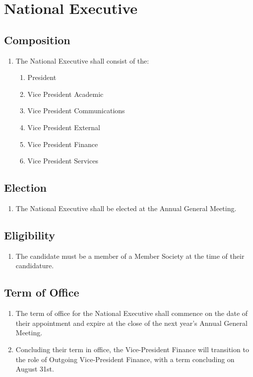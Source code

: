 \section{National Executive}
\label{national-executive}

\subsection{Composition}
\label{national-executive-composition}

\begin{enumerate}
 \item The National Executive shall consist of the:
  \begin{enumerate}
   \item President
   \item Vice President Academic
   \item Vice President Communications
   \item Vice President External
   \item Vice President Finance
   \item Vice President Services
  \end{enumerate}
\end{enumerate}

\subsection{Election}
\label{national-executive-election}

\begin{enumerate}
 \item The National Executive shall be elected at the Annual General Meeting.
\end{enumerate}

\subsection{Eligibility}
\label{national-executive-eligibility}

\begin{enumerate}
 \item The candidate must be a member of a Member Society at the time of their candidature.
\end{enumerate}

\subsection{Term of Office}
\label{national-executive-term-of-office}

\begin{enumerate}
 \item The term of office for the National Executive shall commence on the date of their appointment and expire at the close of the next year’s Annual General Meeting.
 \item Concluding their term in office, the Vice-President Finance will transition to the role of Outgoing Vice-President Finance, with a term concluding on August 31st.
\end{enumerate}
